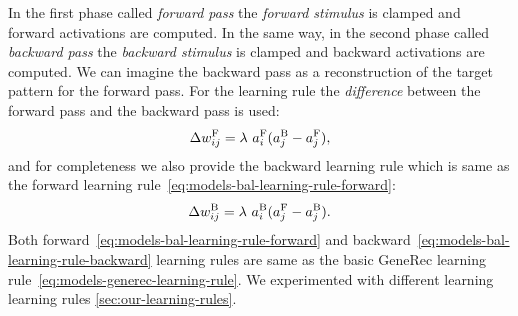 In the first phase called \emph{forward pass} the \emph{forward stimulus} is clamped and forward activations are computed. In the same way, in the second phase called \emph{backward pass} the \emph{backward stimulus} is clamped and backward activations are computed. We can imagine the backward pass as a reconstruction of the target pattern for the forward pass. For the learning rule the \emph{difference} between the forward pass and the backward pass is used: 
\begin{equation}
  \label{eq:models-bal-learning-rule-forward}
  \Delta w_{ij}^{\rm F} = \lambda \ a_i^{\rm F}(a_j^{\rm B} - a_j^{\rm F}),
\end{equation}
and for completeness we also provide the backward learning rule which is same as the forward learning rule~\ref{eq:models-bal-learning-rule-forward}: 
\begin{equation}
  \label{eq:models-bal-learning-rule-backward}
  \Delta w_{ij}^{\rm B} = \lambda \ a_i^{\rm B}(a_j^{\rm F} - a_j^{\rm B}). 
\end{equation}
Both forward~\ref{eq:models-bal-learning-rule-forward} and backward~\ref{eq:models-bal-learning-rule-backward} learning rules are same as the basic GeneRec learning rule~\ref{eq:models-generec-learning-rule}. We experimented with different learning learning rules \ref{sec:our-learning-rules}. 

 


